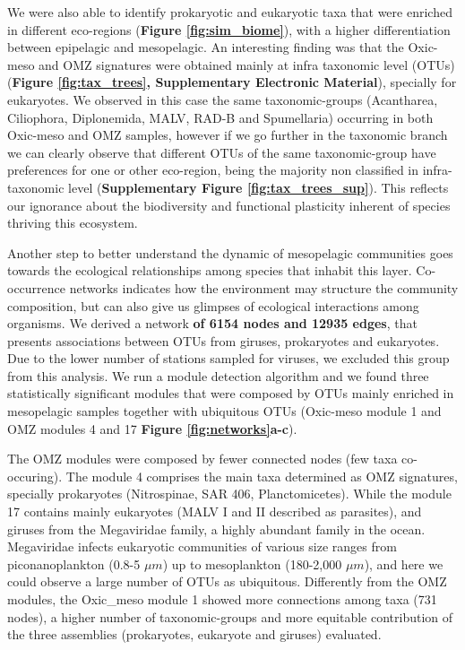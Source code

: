 \documentclass[fleqn,10pt]{wlscirep}
\begin{document}
We were also able to identify prokaryotic and eukaryotic taxa that were enriched in different eco-regions (\textbf{Figure \ref{fig:sim_biome}}), with a higher differentiation between epipelagic and mesopelagic. An interesting finding was that the Oxic-meso and OMZ signatures were obtained mainly at infra taxonomic level (OTUs) (\textbf{Figure \ref{fig:tax_trees}, Supplementary Electronic Material}), specially for eukaryotes. We observed in this case the same taxonomic-groups (Acantharea, Ciliophora, Diplonemida, MALV, RAD-B and Spumellaria) occurring in both Oxic-meso and OMZ samples, however if we go further in the taxonomic branch we can clearly observe that different OTUs of the same taxonomic-group have preferences for one or other eco-region, being the majority non classified in infra-taxonomic level (\textbf{Supplementary Figure \ref{fig:tax_trees_sup}}). This reflects our ignorance about the biodiversity and functional
plasticity inherent of species thriving this ecosystem.

Another step to better understand the dynamic of mesopelagic communities goes towards the ecological relationships among species that inhabit this layer. Co-occurrence networks indicates how the environment may structure the community composition, but can also give us glimpses of ecological interactions among organisms. We derived a network \textbf{of 6154 nodes and 12935 edges}, that presents associations between OTUs from giruses, prokaryotes and eukaryotes. Due to the lower number of stations sampled for viruses, we excluded this group from this analysis. We run a module detection algorithm and we found three statistically significant modules that were composed by OTUs mainly enriched in mesopelagic  samples together with ubiquitous OTUs (Oxic-meso module 1 and OMZ modules 4 and 17 \textbf{Figure \ref{fig:networks}a-c}).

The OMZ modules were composed by fewer connected nodes (few taxa co-occuring).  The module 4 comprises the main taxa determined as OMZ signatures, specially prokaryotes (Nitrospinae, SAR 406, Planctomicetes). While the module 17 contains mainly eukaryotes (MALV I and II described as parasites), and giruses from the Megaviridae family, a highly abundant family in the ocean. Megaviridae infects eukaryotic communities of various size ranges from piconanoplankton (0.8-5 $\mu m$) up to mesoplankton (180-2,000 $\mu m$), and here we could observe a large number of OTUs as ubiquitous. Differently from the OMZ modules, the Oxic\_meso module 1 showed more connections among taxa (731 nodes), a higher number of taxonomic-groups and more equitable contribution of the three assemblies (prokaryotes, eukaryote and giruses) evaluated.
\end{document}
